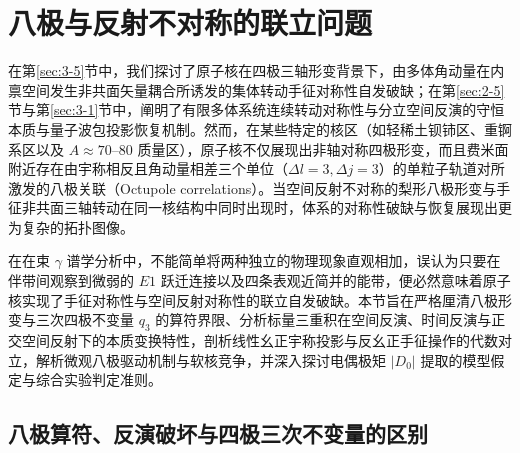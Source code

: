 \section{八极与反射不对称的联立问题}\label{sec:3-7}

在第\ref{sec:3-5}节中，我们探讨了原子核在四极三轴形变背景下，由多体角动量在内禀空间发生非共面矢量耦合所诱发的集体转动手征对称性自发破缺；在第\ref{sec:2-5}节与第\ref{sec:3-1}节中，阐明了有限多体系统连续转动对称性与分立空间反演的守恒本质与量子波包投影恢复机制。然而，在某些特定的核区（如轻稀土钡铈区、重锕系区以及 $A \approx 70$--$80$ 质量区），原子核不仅展现出非轴对称四极形变，而且费米面附近存在由宇称相反且角动量相差三个单位（$\Delta l = 3, \Delta j = 3$）的单粒子轨道对所激发的八极关联（Octupole correlations）。当空间反射不对称的梨形八极形变与手征非共面三轴转动在同一核结构中同时出现时，体系的对称性破缺与恢复展现出更为复杂的拓扑图像。

在在束 $\gamma$ 谱学分析中，不能简单将两种独立的物理现象直观相加，误认为只要在伴带间观察到微弱的 $E1$ 跃迁连接以及四条表观近简并的能带，便必然意味着原子核实现了手征对称性与空间反射对称性的联立自发破缺。本节旨在严格厘清八极形变与三次四极不变量 $q_3$ 的算符界限、分析标量三重积在空间反演、时间反演与正交空间反射下的本质变换特性，剖析线性幺正宇称投影与反幺正手征操作的代数对立，解析微观八极驱动机制与软核竞争，并深入探讨电偶极矩 $|D_0|$ 提取的模型假定与综合实验判定准则。

\subsection{八极算符、反演破坏与四极三次不变量的区别}\label{sec:3-7-1}

